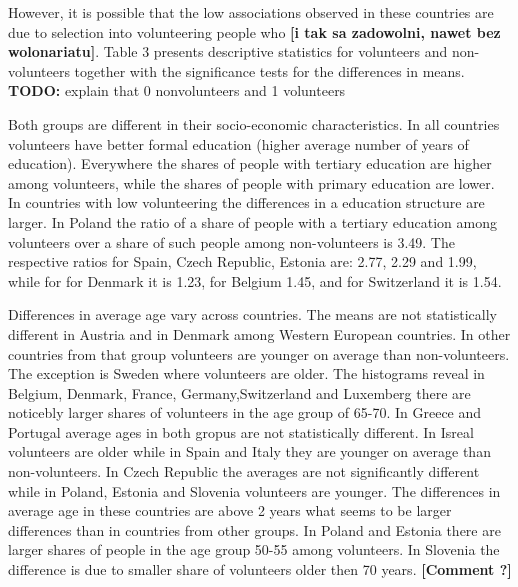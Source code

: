 \documentclass[10pt, letterpaper]{article}
\begin{document}
\begin{spacing}{1.4}
However, it is possible that the low associations observed in these countries are due to selection into volunteering people who \textbf{[i tak sa zadowolni, nawet bez wolonariatu]}. Table 3 presents descriptive statistics for volunteers and non-volunteers together with the significance tests for the differences in means.  \\

{\bf TODO:} explain that 0 nonvolunteers and 1 volunteers
\begin{spacing}{.9}
\centering 
\begin{tiny} 
	 
      \label{DescT0} 
\end{tiny}
\end{spacing}

Both groups are different in their socio-economic characteristics. In all countries volunteers have better formal education (higher average number of years of education). Everywhere the shares of people with tertiary education are higher among volunteers, while the shares of people with primary education are lower. In countries with low volunteering the differences in a education structure are larger. In Poland the ratio of a share of people with a tertiary  education among volunteers over a share of such people among non-volunteers is 3.49. The respective ratios for Spain, Czech Republic, Estonia are: 2.77, 2.29 and 1.99, while for for Denmark it is 1.23, for Belgium 1.45, and for Switzerland it is 1.54. 

Differences in average age vary across countries. The means are  not statistically different  in Austria and in Denmark among Western European countries. In other countries from that group volunteers are younger  on average than non-volunteers. The exception is Sweden where volunteers are older. The histograms reveal in Belgium, Denmark, France, Germany,Switzerland and Luxemberg there are noticebly larger shares of volunteers in the age group of 65-70. In Greece and Portugal average ages in both gropus are not statistically different. In Isreal volunteers are older while in Spain and Italy they are younger on average than non-volunteers. In Czech Republic the averages are not significantly different while in Poland, Estonia and Slovenia volunteers are younger. The differences in average age in these countries are above 2 years what seems to be larger differences than in countries from other groups. In Poland and Estonia there are larger shares of people in the age group 50-55 among volunteers.  In Slovenia the difference is due to smaller share of volunteers older then 70 years. \textbf{[Comment ?]}


\end{spacing}
\end{document}
